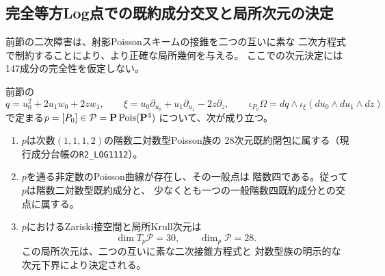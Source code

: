 
\subsection{完全等方Log点での既約成分交叉と局所次元の決定}
\label{subsec:quadric-isotropic-local-dimension}

前節の二次障害は、射影Poissonスキームの接錐を二つの互いに素な
二次方程式で制約することにより、より正確な局所幾何を与える。
ここでの次元決定には147成分の完全性を仮定しない。

\begin{theorem}
\label{thm:quadric-isotropic-dimension28}
前節の
\[
 q=u_0^2+2u_1w_0+2zw_1,\qquad
 \xi=u_0\partial_{u_0}+u_1\partial_{u_1}-2z\partial_z,\qquad
 \iota_{P_0}\Omega=dq\wedge\iota_\xi(du_0\wedge du_1\wedge dz)
\]
で定まる$p=[P_0]\in\mathcal P=\mathbf P\operatorname{Pois}(\mathbf P^4)$
について、次が成り立つ。
\begin{enumerate}
\item $p$は次数$(1,1,1,2)$の階数二対数型Poisson族の
28次元既約閉包に属する（現行成分台帳の\texttt{R2\_LOG1112}）。
\item $p$を通る非定数のPoisson曲線が存在し、その一般点は
階数四である。従って$p$は階数二対数型既約成分と、
少なくとも一つの一般階数四既約成分との交点に属する。
\item $p$におけるZariski接空間と局所Krull次元は
\[
 \boxed{\dim T_p\mathcal P=30,\qquad \dim_p\mathcal P=28.}
\]
この局所次元は、二つの互いに素な二次接錐方程式と
対数型族の明示的な次元下界により決定される。
\end{enumerate}
\end{theorem}

